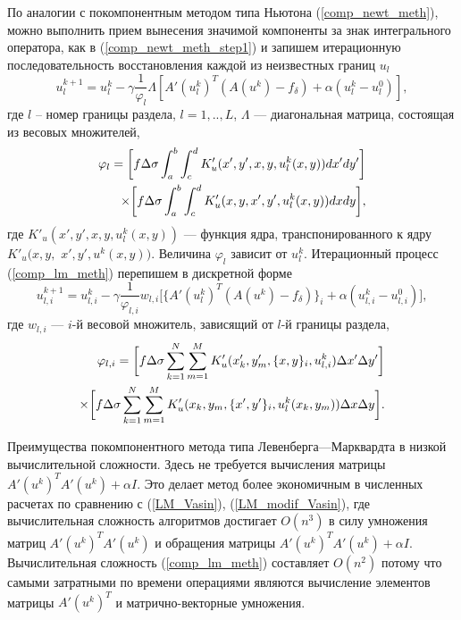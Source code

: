 По аналогии с покомпонентным методом типа Ньютона (\ref{comp_newt_meth}), можно выполнить прием вынесения значимой компоненты за знак интегрального оператора, как в (\ref{comp_newt_meth_step1}) и запишем итерационную последовательность восстановления каждой из неизвестных границ $u_l$
\begin{equation}\label{comp_lm_meth}
u_l^{k+1}=u_l^k-\gamma\frac{1}{\varphi_l}\Lambda[ A'(u_l^k)^T(A(u^k)-f_\delta)+\alpha (u_l^k-u_l^0)],
\end{equation}
где $l$ -- номер границы раздела, $l=1,..,L$, $\Lambda$ --- диагональная матрица, состоящая из весовых множителей, 
\begin{equation*}
\begin{aligned}
\varphi_l=\bigg[ f\Delta\sigma\int_{a}^{b}\int_{c}^{d}
K'_u(x',y', x, y, u_l^k(x,y))dx'dy'\bigg] \notag \\ \times\bigg[f\Delta\sigma\int_{a}^{b}\int_{c}^{d}K'_u(x,y, x',y',u_l^k(x,y))dxdy\bigg], 
\end{aligned}
\end{equation*} 
где $K'_u(x',y', x, y, u_l^k(x,y))$ --- функция ядра, транспонированного к ядру $K'_u(x,y,$ $ x',y',u^k(x,y))$. Величина $\varphi_l$ зависит от $u_l^k$.
Итерационный процесс (\ref{comp_lm_meth}) перепишем в дискретной форме
\begin{equation}\label{comp_lm_meth_disc}
u_{l,i}^{k+1}=u_{l,i}^k-\gamma\frac{1}{\varphi_{l,i}}w_{l,i}\bigg[ \{A'(u_l^k)^T(A(u^k)-f_\delta)\}_i+\alpha (u_{l,i}^k-u_{l,i}^0)\bigg],
\end{equation}
где $w_{l,i}$ --- $i$-й весовой множитель, зависящий от $l$-й границы раздела,
\begin{equation*}
\begin{aligned}
\varphi_{l,i}=\bigg[ f\Delta\sigma\sum\limits_{k=1}^{N}
\sum\limits_{m=1}^{M}
K'_u(x'_k,y'_m, \{x, y\}_i, u_{l,i}^k) \Delta x' \Delta y'\bigg] \notag \\ \times\bigg[f\Delta\sigma\sum\limits_{k=1}^{N}
\sum\limits_{m=1}^{M}K'_u(x_k,y_m, \{x',y'\}_i,u_l^k(x_k,y_m))\Delta x \Delta y\bigg]. 
\end{aligned}
\end{equation*}

Преимущества покомпонентного метода типа Левенберга---Марквардта в низкой вычислительной сложности. Здесь не требуется вычисления матрицы $A'(u^k)^T A'(u^k)+\alpha I$. Это делает метод более экономичным в численных расчетах по сравнению с (\ref{LM_Vasin}), (\ref{LM_modif_Vasin}), где вычислительная сложность алгоритмов достигает $O(n^3)$ в силу умножения матриц $A'(u^k)^T A'(u^k)$ и обращения матрицы $A'(u^k)^T A'(u^k)+\alpha I$. Вычислительная сложность (\ref{comp_lm_meth}) составляет $O(n^2)$ потому что самыми затратными по времени операциями являются вычисление элементов матрицы $A'(u^k)^T$ и матрично-векторные умножения.

